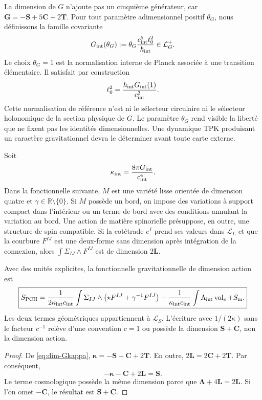 La dimension de \(G\) n'ajoute pas un cinquième générateur, car
\(\mathbf G=-\mathbf S+5\mathbf C+2\mathbf T\). Pour tout paramètre
adimensionnel positif \(\theta_G\), nous définissons la famille covariante
\begin{equation}
 G_{\rm int}(\theta_G)
 :=\theta_G\frac{c_{\rm int}^{5}t_0^2}{\hbar_{\rm int}}
 \in\mathcal L_G^+.
 \label{eq:G-interno}
\end{equation}
Le choix \(\theta_G=1\) est la normalisation interne de Planck associée à
une transition élémentaire. Il satisfait par construction
\[
 \ell_0^2=\frac{\hbar_{\rm int}G_{\rm int}(1)}
 {c_{\rm int}^{3}}.
\]
Cette normalisation de référence n'est ni le sélecteur circulaire ni le sélecteur
holonomique de la section physique de \(G\).
Le paramètre \(\theta_G\) rend visible la liberté que ne fixent pas les
identités dimensionnelles. Une dynamique TPK produisant un caractère
gravitationnel devra le déterminer avant toute carte externe.

Soit
\[
 \kappa_{\rm int}=\frac{8\pi G_{\rm int}}{c_{\rm int}^{4}}.
\]
Dans la fonctionnelle suivante, \(M\) est une variété lisse orientée de
dimension quatre et \(\gamma\in\mathbb R\setminus\{0\}\). Si \(M\) possède un
bord, on impose des variations à support compact dans l'intérieur ou un
terme de bord avec des conditions annulant la variation au bord. Une
action de matière spinorielle présuppose, en outre, une structure de spin
compatible.
Si la cotétrade \(e^I\) prend ses valeurs dans \(\mathcal L_L\) et que la courbure
\(F^{IJ}\) est une deux-forme sans dimension après intégration de la connexion,
alors
\(\int\Sigma_{IJ}\wedge F^{IJ}\) est de dimension \(2\mathbf L\).

\begin{theorem}
\label{thm:homogeneidad-pch}
Avec des unités explicites, la fonctionnelle gravitationnelle de dimension action est
\[
 \boxed{
 S_{\rm PCH}
 =\frac1{2\kappa_{\rm int}c_{\rm int}}
 \int\Sigma_{IJ}\wedge
 \left(\star F^{IJ}+\gamma^{-1}F^{IJ}\right)
 -\frac1{\kappa_{\rm int}c_{\rm int}}
 \int\Lambda_{\rm int}\operatorname{vol}_e
 +S_{\rm m}.}
 \]
Les deux termes géométriques appartiennent à \(\mathcal L_S\). L'écriture avec
\(1/(2\kappa)\) sans le facteur \(c^{-1}\) relève d'une convention
\(c=1\) ou possède la dimension \(\mathbf S+\mathbf C\), non la dimension action.
\end{theorem}

\begin{proof}
De \eqref{eq:dim-Gkappa},
\(\boldsymbol\kappa=-\mathbf S+\mathbf C+2\mathbf T\). En outre,
\(2\mathbf L=2\mathbf C+2\mathbf T\). Par conséquent,
\[
 -\boldsymbol\kappa-\mathbf C+2\mathbf L
 =\mathbf S.
\]
Le terme cosmologique possède la même dimension parce que
\(\boldsymbol\Lambda+4\mathbf L=2\mathbf L\). Si l'on omet
\(-\mathbf C\), le résultat est \(\mathbf S+\mathbf C\).
\end{proof}


